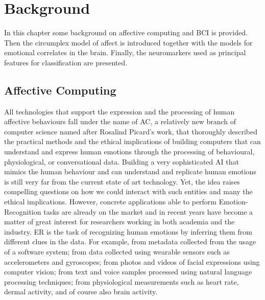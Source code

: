 \chapter{Background}
\label{chap:background}
In this chapter some background on affective computing and BCI is provided. Then the circumplex model of affect is introduced together with the models for emotional correlates in the brain. Finally, the neuromarkers used as principal features for classification are presented.

\section{Affective Computing}
\label{sec:affective_computing}
All technologies that support the expression and the processing of human affective behaviours fall under the name of \ac{AC}, a relatively new branch of computer science named after Rosalind Picard’s work\cite{picard_mit_nodate}, that thoroughly described the practical methods and the ethical implications of building computers that can understand and express human emotions through the processing of behavioural, physiological, or conversational data. Building a very sophisticated \ac{AI} that mimics the human behaviour and can understand and replicate human emotions is still very far from the current state of art technology. Yet, the idea raises compelling questions on how we could interact with such entities and many the ethical implications. However, concrete applications able to perform Emotion-Recognition tasks are already on the market and in recent years have become a matter of great interest for researchers working in both academia and the industry. \ac{ER} is the task of recognizing human emotions by inferring them from different clues in the data. For example, from metadata collected from the usage of a software system; from data collected using wearable sensors such as accelerometers and gyroscopes; from photos and videos of facial expressions using computer vision; from text and voice samples processed using natural language processing techniques; from physiological measurements such as heart rate, dermal activity, and of course also brain activity.

